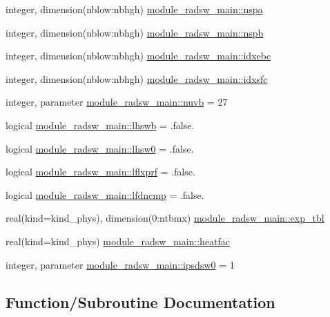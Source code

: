 \begin{DoxyCompactItemize}
\item 
integer, dimension(nblow\+:nbhgh) \hyperlink{group__module__radsw__main_ga4c0fc140a51c619089128f52e4bb878c}{module\+\_\+radsw\+\_\+main\+::nspa}
\item 
integer, dimension(nblow\+:nbhgh) \hyperlink{group__module__radsw__main_ga6be022a4a1ae32248d9721a9fff93db6}{module\+\_\+radsw\+\_\+main\+::nspb}
\item 
integer, dimension(nblow\+:nbhgh) \hyperlink{group__module__radsw__main_gaa20102786f7e7f8c71fb2783082eac1b}{module\+\_\+radsw\+\_\+main\+::idxebc}
\item 
integer, dimension(nblow\+:nbhgh) \hyperlink{group__module__radsw__main_gad295d723dd7d269cb51c73923a4cbb94}{module\+\_\+radsw\+\_\+main\+::idxsfc}
\item 
integer, parameter \hyperlink{group__module__radsw__main_ga177282b3087dce2f54f1233ee8631231}{module\+\_\+radsw\+\_\+main\+::nuvb} = 27
\item 
logical \hyperlink{group__module__radsw__main_ga08bfecbd5edb2ad3ba0ae836cfe18d05}{module\+\_\+radsw\+\_\+main\+::lhswb} = .false.
\item 
logical \hyperlink{group__module__radsw__main_ga3fd8cae0d38772eea36ce6ec2d258997}{module\+\_\+radsw\+\_\+main\+::lhsw0} = .false.
\item 
logical \hyperlink{group__module__radsw__main_gac4ab674edb40fda0c89aa8ee331ccdc6}{module\+\_\+radsw\+\_\+main\+::lflxprf} = .false.
\item 
logical \hyperlink{group__module__radsw__main_ga8c0a241d6c1aa69fee4cd24fdbc4256b}{module\+\_\+radsw\+\_\+main\+::lfdncmp} = .false.
\item 
real(kind=kind\+\_\+phys), dimension(0\+:ntbmx) \hyperlink{group__module__radsw__main_ga1f9d18b17cc24321ed1cf45254ac2b0f}{module\+\_\+radsw\+\_\+main\+::exp\+\_\+tbl}
\item 
real(kind=kind\+\_\+phys) \hyperlink{group__module__radsw__main_gaad60e753cdda20d4e84d063280f0dfcc}{module\+\_\+radsw\+\_\+main\+::heatfac}
\item 
integer, parameter \hyperlink{group__module__radsw__main_gae1f88a0b60d69b892cfae83bb9ab67df}{module\+\_\+radsw\+\_\+main\+::ipsdsw0} = 1
\end{DoxyCompactItemize}


\subsection{Function/\+Subroutine Documentation}
